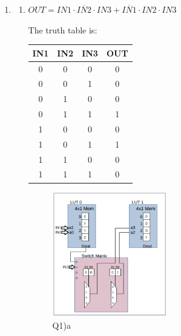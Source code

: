 \documentclass[11pt,letterpaper,titlepage]{article}
\begin{document}
\begin{enumerate}
    
    \item %
    
    \begin{enumerate}
        
        \item %
        
        $OUT = IN1 \cdot \overline{IN2} \cdot IN3 + \overline{IN1} \cdot IN2 \cdot IN3$
        
        The truth table is:
        
        \begin{table}[ht]
        \centering
        \begin{tabular}{@{}cccc@{}}
        \toprule
        IN1 & IN2 & IN3 & OUT \\ \midrule
        0   & 0   & 0   & 0   \\ \midrule
        0   & 0   & 1   & 0   \\ \midrule
        0   & 1   & 0   & 0   \\ \midrule
        0   & 1   & 1   & 1   \\ \midrule
        1   & 0   & 0   & 0   \\ \midrule
        1   & 0   & 1   & 1   \\ \midrule
        1   & 1   & 0   & 0   \\ \midrule
        1   & 1   & 1   & 0   \\ \bottomrule
        \end{tabular}
        \end{table}
        
        \begin{figure}[ht]
            \centering
            \includegraphics[width=0.5\textwidth]{Q1a.PNG}
            \caption{Q1)a}
        \end{figure}
        

\end{enumerate}
\end{enumerate}
\end{document}
